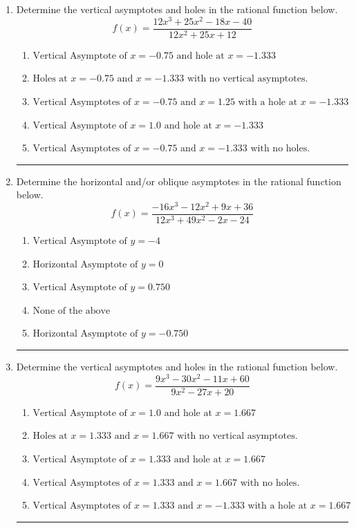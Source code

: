 \documentclass[14pt]{extbook}
\newcommand{\litem}[1]{\item#1\hspace*{-1cm}\rule{\textwidth}{0.4pt}}
\begin{document}
\begin{enumerate}
{\begin{enumerate}[label=\Alph*.]
\end{enumerate} }
\litem{
Determine the vertical asymptotes and holes in the rational function below.\[ f(x) = \frac{12x^{3} +25 x^{2} -18 x -40}{12x^{2} +25 x + 12} \]\begin{enumerate}[label=\Alph*.]
\item \( \text{Vertical Asymptote of } x = -0.75 \text{ and hole at } x = -1.333 \)
\item \( \text{Holes at } x = -0.75 \text{ and } x = -1.333 \text{ with no vertical asymptotes.} \)
\item \( \text{Vertical Asymptotes of } x = -0.75 \text{ and } x = 1.25 \text{ with a hole at } x = -1.333 \)
\item \( \text{Vertical Asymptote of } x = 1.0 \text{ and hole at } x = -1.333 \)
\item \( \text{Vertical Asymptotes of } x = -0.75 \text{ and } x = -1.333 \text{ with no holes.} \)

\end{enumerate} }
\litem{
Determine the horizontal and/or oblique asymptotes in the rational function below.\[ f(x) = \frac{-16x^{3} -12 x^{2} +9 x + 36}{12x^{3} +49 x^{2} -2 x -24} \]\begin{enumerate}[label=\Alph*.]
\item \( \text{Vertical Asymptote of } y = -4  \)
\item \( \text{Horizontal Asymptote of } y = 0  \)
\item \( \text{Vertical Asymptote of } y = 0.750  \)
\item \( \text{None of the above} \)
\item \( \text{Horizontal Asymptote of } y = -0.750  \)

\end{enumerate} }
\litem{
Determine the vertical asymptotes and holes in the rational function below.\[ f(x) = \frac{9x^{3} -30 x^{2} -11 x + 60}{9x^{2} -27 x + 20} \]\begin{enumerate}[label=\Alph*.]
\item \( \text{Vertical Asymptote of } x = 1.0 \text{ and hole at } x = 1.667 \)
\item \( \text{Holes at } x = 1.333 \text{ and } x = 1.667 \text{ with no vertical asymptotes.} \)
\item \( \text{Vertical Asymptote of } x = 1.333 \text{ and hole at } x = 1.667 \)
\item \( \text{Vertical Asymptotes of } x = 1.333 \text{ and } x = 1.667 \text{ with no holes.} \)
\item \( \text{Vertical Asymptotes of } x = 1.333 \text{ and } x = -1.333 \text{ with a hole at } x = 1.667 \)


\end{enumerate}}
\end{enumerate}
\end{document}
